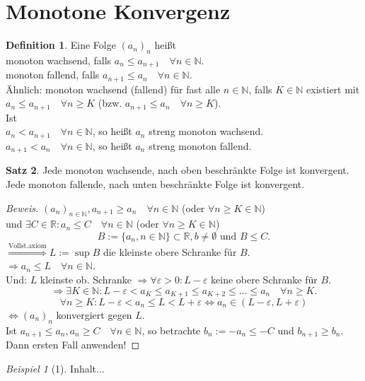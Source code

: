 \documentclass[12pt,a4paper,titlepage]{article} %
\theoremstyle{definition}
\newtheorem{satz}{Satz}[subsection]
\newtheorem{defi}[satz]{Definition}
\theoremstyle{remark}
\newtheorem*{bsp}{Beispiel}
\newenvironment{bew}{\begin{proof}[Beweis]}{\end{proof}}
\newcommand{\N}{\mathbb{N}}
\newcommand{\R}{\mathbb{R}}
\begin{document}
\section{Monotone Konvergenz}
\begin{defi}
	Eine Folge \((a_n)_n\) heißt \\monoton wachsend, falls \(a_n\leq a_{n+1} \quad \forall n\in\N \).\\monoton fallend, falls \(a_{n+1} \leq a_n \quad\forall n\in\N \).\\
	Ähnlich: monoton wachsend (fallend) für fast alle \(n\in\N\), falls \( K\in\N \) existiert mit \( a_n\leq a_{n+1} \quad \forall n\geq K \) (bzw. \(a_{n+1}\leq a_n \quad \forall n\geq K \)).\\
	Ist \\\( a_n<a_{n+1} \quad \forall n\in\N \), so heißt \(a_n\) streng monoton wachsend.\\
	\( a_{n+1}<a_n \quad \forall n\in\N \), so heißt \(a_n\) streng monoton fallend.
\end{defi}
\begin{satz}
	Jede monoton wachsende, nach oben beschränkte Folge ist konvergent. Jede monoton fallende, nach unten beschränkte Folge ist konvergent.
\end{satz}
\begin{bew}
	\((a_n)_{n\in\N}, a_{n+1} \geq a_n \quad \forall n\in\N \) (oder \( \forall n\geq K \in\N \))\\
	und \( \exists C\in\R: a_n \leq C \quad \forall n\in\N \) (oder \( \forall n\geq K \in\N \))\\
	\[ B:= \{a_n, n\in\N\} \subset \R, b\neq \emptyset \text{ und } B\leq C. \]
	\(\overset{\text{Vollst.axiom}}{\Rightarrow} L := \sup B\) die kleinste obere Schranke für \(B\).\\
	\(\Rightarrow a_n \leq L \quad \forall n\in\N \).\\
	Und: \(L\) kleinste ob. Schranke \( \Rightarrow \forall \varepsilon>0: L-\varepsilon \) keine obere Schranke für \(B\).\\
	\[ \Rightarrow \exists K \in\N: L-\varepsilon < a_K \leq a_{K+1} \leq a_{K+2} \leq \ldots \leq a_n \quad \forall n\geq K. \]
	\[ \forall n\geq K: L-\varepsilon < a_n \leq L < L + \varepsilon \Leftrightarrow a_n \in (L-\varepsilon, L + \varepsilon) \]
	\( \Leftrightarrow (a_n)_n \) konvergiert gegen \(L\).\\
	Ist \(a_{n+1} \leq a_n, a_n\geq C \quad \forall n\in\N \), so betrachte \(b_n := -a_n \leq -C \) und \(b_{n+1} \geq b_n\). Dann ersten Fall anwenden!
\end{bew}
\begin{bsp}[1]
	Inhalt...
\end{bsp}
\end{document}
